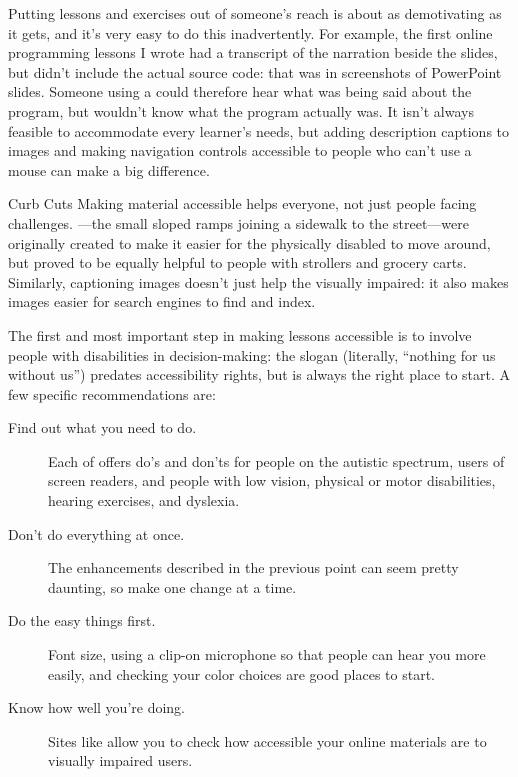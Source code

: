 
Putting lessons and exercises out of someone's reach is about as demotivating as it gets,
and it's very easy to do this inadvertently.
For example,
the first online programming lessons I wrote had a transcript of the narration
beside the slides,
but didn't include the actual source code:
that was in screenshots of PowerPoint slides.
Someone using a 
could therefore hear what was being said about the program,
but wouldn't know what the program actually was.
It isn't always feasible to accommodate every learner's needs,
but adding description captions to images
and making navigation controls accessible to people who can't use a mouse
can make a big difference.

\begin{aside}{Curb Cuts}
  Making material accessible helps everyone,
  not just people facing challenges.
  ---the small sloped ramps joining a sidewalk to the street---were
  originally created to make it easier for the physically disabled to move around,
  but proved to be equally helpful to people with strollers and grocery carts.
  Similarly,
  captioning images doesn't just help the visually impaired:
  it also makes images easier for search engines to find and index.
\end{aside}

The first and most important step in making lessons accessible is
to involve people with disabilities in decision-making:
the slogan \emph{}
(literally, ``nothing for us without us'')
predates accessibility rights,
but is always the right place to start.
A few specific recommendations are:

\begin{description}

\item[Find out what you need to do.]
  Each of 
  offers do's and don'ts for people on the autistic spectrum,
  users of screen readers,
  and people with low vision,
  physical or motor disabilities,
  hearing exercises,
  and dyslexia.

\item[Don't do everything at once.]
  The enhancements described in the previous point can seem pretty daunting,
  so make one change at a time.

\item[Do the easy things first.]
  Font size,
  using a clip-on microphone so that people can hear you more easily,
  and checking your color choices are good places to start.

\item[Know how well you're doing.]
  Sites like  allow you to check
  how accessible your online materials are to visually impaired users.

\end{description}

